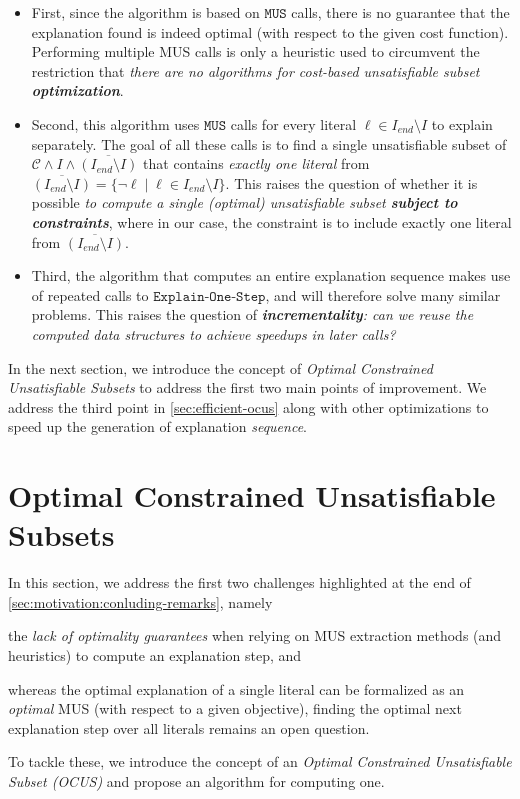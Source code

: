 \documentclass[twoside,11pt]{article}
\newcommand\m[1]{\mathcal{#1}}
\newcommand\Iend{\ensuremath{I_\mathit{end} }\xspace}
\newcommand\formulac{\ensuremath{\m{C} }\xspace}
\newcommand\mm[1]{\ensuremath{#1}\xspace}
\newcommand\call[1]{\mm{\texttt{#1}}}
\newcommand\onestep{\ensuremath{\call{Explain-One-Step}}\xspace}
\begin{document}
\begin{itemize}
	
\item First, since the algorithm is based on \call{MUS} calls, there is no guarantee that the explanation found is indeed optimal (with respect to the given cost function). Performing multiple MUS calls is only a heuristic used to circumvent the restriction that \textit{there are no algorithms for cost-based unsatisfiable subset \textbf{optimization}}. 

\item Second, this algorithm uses \call{MUS} calls for every literal $ \ell \in \Iend \setminus I$ to explain separately. The goal of all these calls is to find a single unsatisfiable subset of $\formulac \land I \land \overline{(\Iend\setminus I)}$ that contains \emph{exactly one literal} from $\overline{(\Iend\setminus I)}= \{ \lnot \ell \mid \ell \in \Iend \setminus I\}$. This raises the question of whether it is possible \textit{to compute a single (optimal) unsatisfiable subset \textbf{subject to constraints}}, where in our case, the constraint is to include exactly one literal from $\overline{(\Iend\setminus I)}$. 

\item Third, the algorithm that computes an entire explanation sequence makes use of repeated calls to \onestep, and will therefore solve many similar problems. This raises the question of \textit{\textbf{incrementality}: can we reuse the computed data structures to achieve speedups in later calls?}

\end{itemize}

In the next section, we introduce the concept of \emph{Optimal Constrained Unsatisfiable Subsets} to address the first two main points of improvement. We address the third point in \cref{sec:efficient-ocus} along with other optimizations to speed up the generation of explanation \emph{sequence}.

\section{Optimal Constrained Unsatisfiable Subsets}\label{sec:OCUS}

	In this section, we address the first two challenges highlighted at the end of \cref{sec:motivation:conluding-remarks}, namely 
	\begin{inparaenum}[(1)]
		\item  the \emph{lack of optimality guarantees} when relying on MUS extraction methods (and heuristics) to compute an explanation step, and 
		\item whereas the optimal explanation of a single literal can be formalized as an \emph{optimal} MUS (with respect to a given objective), finding the optimal next explanation step over all literals remains an open question. 
	\end{inparaenum}
	 To tackle these, we introduce the concept of an \emph{Optimal Constrained Unsatisfiable Subset (OCUS)} and propose an algorithm for computing one.
\end{document}
